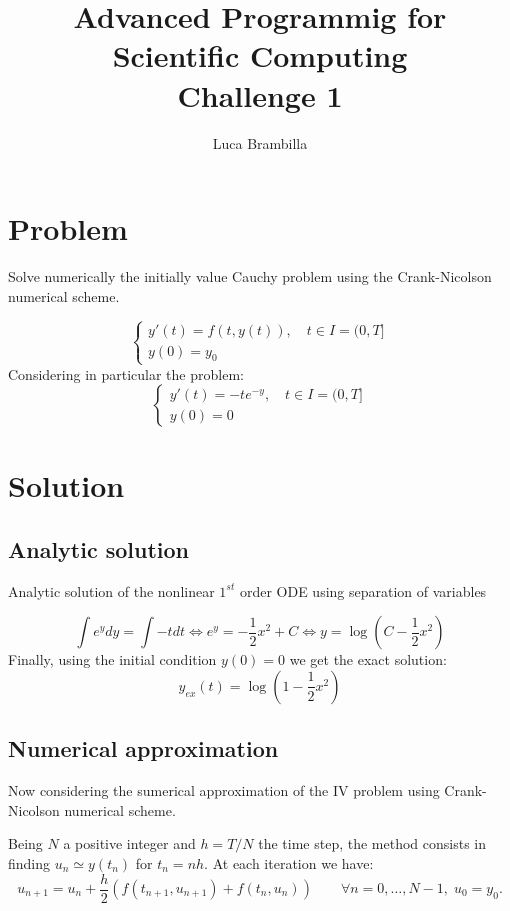 \documentclass[]{article}
\title{Advanced Programmig for Scientific Computing\\Challenge 1}
\author{Luca Brambilla}
\begin{document}
	
	\maketitle
	
	
\section{Problem}
Solve numerically the initially value Cauchy problem using the Crank-Nicolson numerical scheme.

$$
	\begin{cases}
		y'(t) = f(t, y(t)), \quad t \in I = (0, T] \\
		y(0) = y_0
	\end{cases}
$$
Considering in particular the problem:
$$
\begin{cases}
	y'(t) = -t e^{-y} , \quad t \in I = (0, T] \\
	y(0) = 0
\end{cases}
$$


\section{Solution}

\subsection{Analytic solution}
Analytic solution of the nonlinear $1^{st}$ order ODE using separation of variables

$$\int e^y dy = \int -t dt \Longleftrightarrow e^y = -\frac{1}{2} x^2 + C \Longleftrightarrow y = \log \left( C - \frac{1}{2} x^2 \right)$$
Finally, using the initial condition $y(0)=0$ we get the exact solution:
$$y_{ex} (t) = \log\left( 1 - \frac{1}{2} x^2 \right)$$

\newpage

\subsection{Numerical approximation}
Now considering the sumerical approximation of the IV problem using Crank-Nicolson numerical scheme. 

Being $N$ a positive integer and $h = T /N$ the time step, the method consists in finding $u_n \simeq y(t_n )$ for $t_n = nh$.
At each iteration we have:
$$u_{n+1} = u_n + \frac{h}{2} \left( f(t_{n+1},u_{n+1}) + f(t_{n},u_{n})  \right) \qquad \forall n = 0, \ldots , N - 1, \; u_0 = y_0 . $$
\end{document}
